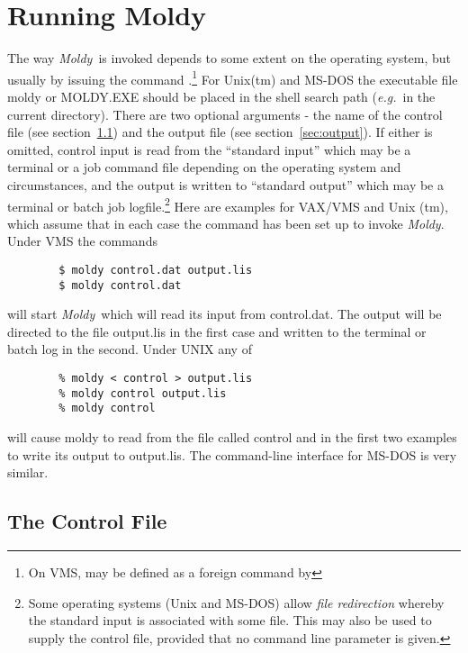 \documentclass[a4paper,twoside]{report}
\newcommand{\Fname}[1]{{\upshape\mdseries\sffamily#1}}
\newcommand{\moldy}{\emph{Moldy}}
\newcommand{\eg}{\emph{e.g.}}
\begin{document}
\chapter{Running Moldy}  %

The way \moldy\ is invoked depends to some extent on the operating
system, but usually by issuing the command .\footnote{On
  VMS,  may be defined as a foreign command by } For Unix(tm) and MS-DOS the
executable file \Fname{moldy} or \Fname{MOLDY.EXE} should be placed in
the shell search path (\eg\ in the current directory). There are two
optional arguments - the name of the control file (see
section~\ref{sec:control}) and the output file (see
section~\ref{sec:output}).  If either is omitted, control input is
read from the ``standard input'' which may be a terminal or a job
command file depending on the operating system and circumstances, and
the output is written to ``standard output'' which may be a terminal
or batch job logfile.\footnote{Some operating systems (Unix and
  MS-DOS) allow \emph{file redirection} whereby the standard input is
  associated with some file.  This may also be used to supply the
  control file, provided that no command line parameter is given.}
Here are examples for VAX/VMS and Unix (tm), which assume that in each
case the command has been set up to invoke \moldy.  Under VMS the
commands
\begin{verbatim}
        $ moldy control.dat output.lis
        $ moldy control.dat
\end{verbatim}
will start \moldy\  which will read its input from \Fname{control.dat}.
The output will be directed to the file \Fname{output.lis} in the first
case and written to the terminal or batch log in the second.  Under
UNIX any of
\begin{verbatim}
        % moldy < control > output.lis
        % moldy control output.lis
        % moldy control
\end{verbatim}
will cause moldy to read from the file called \Fname{control} and in
the first two examples to write its output to \Fname{output.lis}.  The
command-line interface for MS-DOS is very similar. 

\section{The Control File}%
\label{sec:control}
\end{document}
